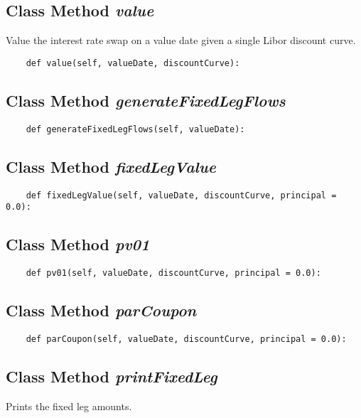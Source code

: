 \documentclass[twoside,11pt]{book}
\begin{document}
\subsection{Class Method {\it value}}
Value the interest rate swap on a value date given a single Libor discount curve. 

\begin{lstlisting}
    def value(self, valueDate, discountCurve):
\end{lstlisting}

\subsection{Class Method {\it generateFixedLegFlows}}


\begin{lstlisting}
    def generateFixedLegFlows(self, valueDate):
\end{lstlisting}

\subsection{Class Method {\it fixedLegValue}}


\begin{lstlisting}
    def fixedLegValue(self, valueDate, discountCurve, principal = 0.0):
\end{lstlisting}

\subsection{Class Method {\it pv01}}


\begin{lstlisting}
    def pv01(self, valueDate, discountCurve, principal = 0.0):
\end{lstlisting}

\subsection{Class Method {\it parCoupon}}


\begin{lstlisting}
    def parCoupon(self, valueDate, discountCurve, principal = 0.0):
\end{lstlisting}

\subsection{Class Method {\it printFixedLeg}}
Prints the fixed leg amounts. 
\end{document}
